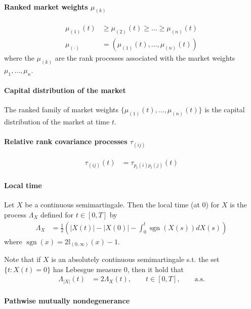 \documentclass[a4paper,landscape,8pt,fleqn]{scrartcl}
\DeclareMathOperator{\sgn}{sgn}				%
\begin{document}
\begin{multicols*}{3}
\paragraph{Ranked market weights $\mu_{(k)}$}
\begin{align*}
\mu_{(1)}(t) &\geq \mu_{(2)}(t) \geq \ldots \geq \mu_{(n)}(t) \\
\mu_{(\cdot)} &= \left( \mu_{(1)}(t), \ldots, \mu_{(n)}(t) \right)
\end{align*}
where the $\mu_{(k)}$ are the rank processes associated with the market weights $\mu_1, \ldots, \mu_n$.

\paragraph{Capital distribution of the market}

The ranked family of market weights $\lbrace \mu_{(1)}(t), \ldots, \mu_{(n)}(t) \rbrace$ is the capital distribution of the market at time $t$.

\paragraph{Relative rank covariance processes $\tau_{(ij)}$}

\begin{align*}
\tau_{(ij)}(t) &= \tau_{p_t(i) p_t(j)}(t)
\end{align*}

\paragraph{Local time}

Let $X$ be a continuous semimartingale. Then the local time (at 0) for $X$ is the process $\Lambda_X$ defined for $t \in [0,T]$ by
\begin{align*}
\Lambda_X &= \frac{1}{2} \left( |X(t)| - |X(0)| - \int_0^t \sgn (X(s)) dX(s) \right)
\end{align*}
where $\sgn(x) = 2 \mathbb{I}_{(0,\infty)}(x) - 1$.

Note that if $X$ is an absolutely continuous semimartingale s.t. the set $\lbrace t: X(t) = 0 \rbrace$ has Lebesgue measure 0, then it hold that
\begin{align*}
\Lambda_{|X|}(t) &= 2 \Lambda_X(t), \qquad t \in [0,T], \qquad \text{a.s.}
\end{align*}

\paragraph{Pathwise mutually nondegenerance}


\end{multicols*}
\end{document}

